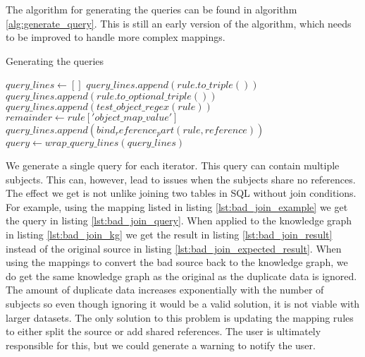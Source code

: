 The algorithm for generating the queries can be found in algorithm \ref{alg:generate_query}. This is still an early version of the algorithm, which needs to be improved to handle more complex mappings.

\begin{algorithm} 
    \caption{Generating the queries}
    \label{alg:generate_query}
    \begin{algorithmic}[1]
        \State $query\_lines \gets []$
                \State $query\_lines.append(rule.to\_triple())$ 
                \State $query\_lines.append(rule.to\_optional\_triple())$
                \State $query\_lines.append(test\_object\_regex(rule))$
                \State $remainder \gets rule['object\_map\_value']$
                    \State $query\_lines.append(bind_reference_part(rule, reference))$
                \EndFor
            \EndIf
        \EndFor
        \State $query \gets wrap\_query\_lines(query\_lines)$
    \end{algorithmic}
\end{algorithm}

We generate a single query for each iterator. This query can contain multiple subjects. This can, however, lead to issues when the subjects share no references. The effect we get is not unlike joining two tables in SQL without join conditions. For example, using the mapping listed in listing \ref{lst:bad_join_example} we get the query in listing \ref{lst:bad_join_query}. When applied to the knowledge graph in listing \ref{lst:bad_join_kg} we get the result in listing \ref{lst:bad_join_result} instead of the original source in listing \ref{lst:bad_join_expected_result}. When using the mappings to convert the bad source back to the knowledge graph, we do get the same knowledge graph as the original as the duplicate data is ignored. The amount of duplicate data increases exponentially with the number of subjects so even though ignoring it would be a valid solution, it is not viable with larger datasets. The only solution to this problem is updating the mapping rules to either split the source or add shared references. The user is ultimately responsible for this, but we could generate a warning to notify the user. 

